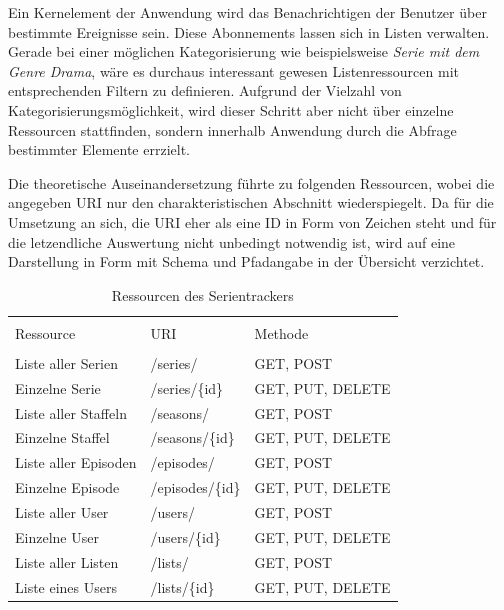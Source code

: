 \documentclass[a4paper]{article}
\begin{document}
Ein Kernelement der Anwendung wird das Benachrichtigen der Benutzer über bestimmte Ereignisse sein. Diese Abonnements lassen sich in Listen verwalten. Gerade bei einer möglichen Kategorisierung wie beispielsweise \textit{Serie mit dem Genre Drama}, wäre es durchaus interessant gewesen Listenressourcen mit entsprechenden Filtern zu definieren. Aufgrund der Vielzahl von Kategorisierungsmöglichkeit, wird dieser Schritt aber nicht über einzelne Ressourcen stattfinden, sondern innerhalb Anwendung durch die Abfrage bestimmter Elemente errzielt.
\newpage

Die theoretische Auseinandersetzung führte zu folgenden Ressourcen, wobei die angegeben URI nur den charakteristischen Abschnitt wiederspiegelt.
Da für die Umsetzung an sich, die URI eher als eine ID in Form von Zeichen steht und für die letzendliche Auswertung nicht unbedingt notwendig ist, wird auf eine Darstellung in Form mit Schema und Pfadangabe in der Übersicht verzichtet.

\begin{table}[H]
\caption{Ressourcen des Serientrackers}

\centering
\begin{tabular}{l l l}
\\ [-0.5ex]

\hline\hline
\\ [-0.5ex]
Ressource & URI & Methode
\\ [1.5ex]
\hline
\\ [-0.5ex]
Liste aller Serien & /series/ & GET, POST \\[1ex]
Einzelne Serie & /series/\{id\} & GET, PUT, DELETE\\[1ex]
Liste aller Staffeln & /seasons/ & GET, POST \\[1ex]
Einzelne Staffel & /seasons/\{id\} & GET, PUT, DELETE\\[1ex]
Liste aller Episoden & /episodes/ & GET, POST \\[1ex]
Einzelne Episode & /episodes/\{id\} & GET, PUT, DELETE\\[1ex]
Liste aller User & /users/ & GET, POST \\[1ex]
Einzelne User & /users/\{id\} & GET, PUT, DELETE\\[1ex]
Liste aller Listen & /lists/ & GET, POST\\[1ex]
Liste eines Users & /lists/\{id\} & GET, PUT, DELETE\\[1ex]
\hline
\end{tabular}
\label{tab:ressourcendesserientrackers}
\end{table}
\end{document}
